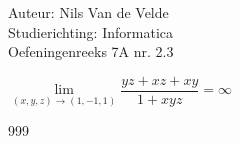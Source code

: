 \documentclass[a4paper]{article}
\newcommand{\llim}{\lim\limits}
\begin{document}
  
\noindent \large Auteur: Nils Van de Velde \\
\noindent \large Studierichting: Informatica\\
\noindent \large Oefeningenreeks 7A nr. 2.3\\

\medskip

\normalsize

$\llim_{(x,y,z)\rightarrow(1,-1,1)} \dfrac{yz+xz+xy}{1+xyz}=\infty$\\

\begin{thebibliography}{999}
\end{thebibliography}
\end{document}
